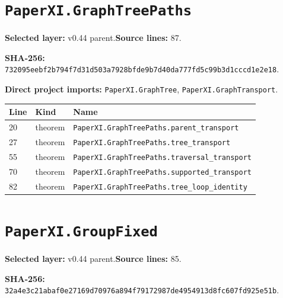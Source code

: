 \documentclass[10pt,oneside]{book}
\begin{document}
\section{\texorpdfstring{\nolinkurl{PaperXI.GraphTreePaths}}{PaperXI.GraphTreePaths}}\label{module:PaperXI.GraphTreePaths}

\textbf{Selected layer:} v0.44 parent.\quad\textbf{Source lines:} 87.\par\textbf{SHA-256:} {\scriptsize\nolinkurl{732095eebf2b794f7d31d503a7928bfde9b7d40da777fd5c99b3d1cccd1e2e18}}.


\textbf{Direct project imports:} \nolinkurl{PaperXI.GraphTree}, \nolinkurl{PaperXI.GraphTransport}.

\begin{longtable}{@{}p{}p{}p{}@{}}\toprule Line&Kind&Name\\\midrule\endhead

20&theorem&\nolinkurl{PaperXI.GraphTreePaths.parent_transport}\\

27&theorem&\nolinkurl{PaperXI.GraphTreePaths.tree_transport}\\

55&theorem&\nolinkurl{PaperXI.GraphTreePaths.traversal_transport}\\

70&theorem&\nolinkurl{PaperXI.GraphTreePaths.supported_transport}\\

82&theorem&\nolinkurl{PaperXI.GraphTreePaths.tree_loop_identity}\\

\bottomrule\end{longtable}

\section{\texorpdfstring{\nolinkurl{PaperXI.GroupFixed}}{PaperXI.GroupFixed}}\label{module:PaperXI.GroupFixed}

\textbf{Selected layer:} v0.44 parent.\quad\textbf{Source lines:} 85.\par\textbf{SHA-256:} {\scriptsize\nolinkurl{32a4e3c21abaf0e27169d70976a894f79172987de4954913d8fc607fd925e51b}}.

\end{document}
